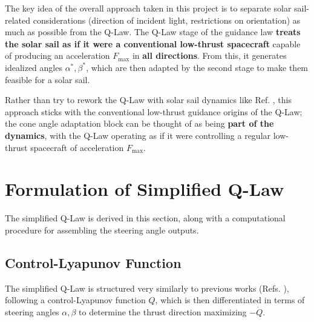 The key idea of the overall approach taken in this project is to separate solar sail-related considerations (direction of incident light, restrictions on orientation) as much as possible from the Q-Law. The Q-Law stage of the guidance law \textbf{treats the solar sail as if it were a conventional low-thrust spacecraft} capable of producing an acceleration \(F_{\max}\) in \textbf{all directions}. From this, it generates idealized angles \(\alpha^*, \beta^*\), which are then adapted by the second stage to make them feasible for a solar sail.

Rather than try to rework the Q-Law with solar sail dynamics like Ref. \cite{oguri2023solar}, this approach sticks with the conventional low-thrust guidance origins of the Q-Law; the cone angle adaptation block can be thought of as being \textbf{part of the dynamics}, with the Q-Law operating as if it were controlling a regular low-thrust spacecraft of acceleration  \(F_{\max}\).

\section{Formulation of Simplified Q-Law}
The simplified Q-Law is derived in this section, along with a computational procedure for assembling the steering angle outputs.

\subsection{Control-Lyapunov Function}
The simplified Q-Law is structured very similarly to previous works (Refs. \cite{petropoulos2004low, vargaperez2016, sanjeev2023}), following a control-Lyapunov function \(Q\), which is then differentiated in terms of steering angles \(\alpha, \beta\) to determine the thrust direction maximizing \(-\dot{Q}\).

